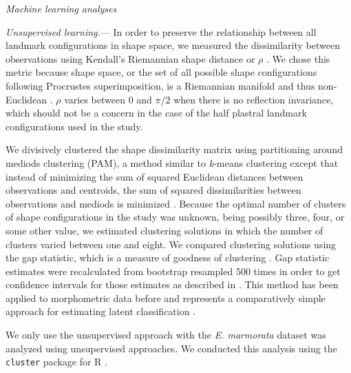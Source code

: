 \documentclass[12pt,letterpaper]{article}
\renewcommand{\subsection}[1]{%
\bigskip
\begin{center}
\begin{large}
\normalfont\itshape #1
\end{large}
\end{center}}
\renewcommand{\subsubsection}[1]{%
\vspace{2ex}
\noindent
\textit{#1.}---}
\begin{document}
\subsection{Machine learning analyses}
\subsubsection{Unsupervised learning}
In order to preserve the relationship between all landmark configurations in shape space, we measured the dissimilarity between observations using Kendall's Riemannian shape distance or \(\rho\) \citep{Kendall1984a,Dryden1998a}. We chose this metric because shape space, or the set of all possible shape configurations following Procrustes superimposition, is a Riemannian manifold and thus non-Euclidean \citep{Dryden1998a}. \(\rho\) varies between 0 and \(\pi / 2\) when there is no reflection invariance, which should not be a concern in the case of the half plastral landmark configurations used in the study.

We divisively clustered the shape dissimilarity matrix using partitioning around mediods clustering (PAM), a method similar to \textit{k}-means clustering except that instead of minimizing the sum of squared Euclidean distances between observations and centroids, the sum of squared dissimilarities between observations and mediods is minimized \citep{Kaufman1990}. Because the optimal number of clusters of shape configurations in the study was unknown, being possibly three, four, or some other value, we estimated clustering solutions in which the number of clusters varied between one and eight. We compared clustering solutions using the gap statistic, which is a measure of goodness of clustering \citep{Tibshirani2001a}. Gap statistic estimates were recalculated from bootstrap resampled 500 times in order to get confidence intervals for those estimates as described in \citet{Tibshirani2001a}. This method has been applied to morphometric data before and represents a comparatively simple approach for estimating latent classification \citep{Claude2008}.

We only use the unsupervised approach with the \textit{E. marmorata} dataset was analyzed using unsupervised approaches. We conducted this analysis using the \texttt{cluster} package for R \citep{Maechler2013}.
\end{document}
